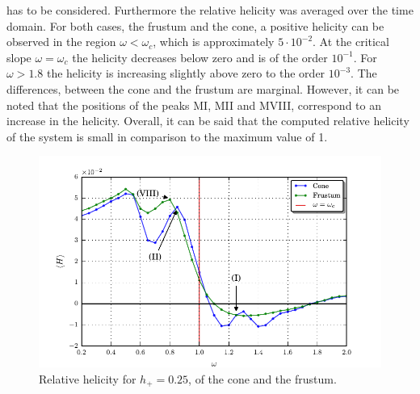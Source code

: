 has to be considered.
Furthermore the relative helicity was averaged over the time domain.
For both cases, the frustum and the cone, a positive helicity can be observed in the region $\omega<\omega_c$, which is
approximately $5\cdot 10^{-2}$.
At the critical slope $\omega=\omega_c$ the helicity decreases below zero and is of the order $10^{-1}$.
For $\omega>1.8$ the helicity is increasing slightly above zero to the order $10^{-3}$.
The differences, between the cone and the frustum are marginal.
However, it can be noted that the positions of the peaks M\RN{1}, M\RN{2} and M\RN{8},
correspond to an increase in the helicity.
Overall, it can be said that the computed relative helicity of the system is small in
comparison to the maximum value of 1.

\begin{figure}[!b]
  \centering
  \includegraphics{gfx/cone/final/helicity.pdf}
  \caption{
      \label{fig:cone:finalhelicity}
      Relative helicity for $h_+=0.25$, of the cone and the frustum.
    }
\end{figure}

\clearpage

